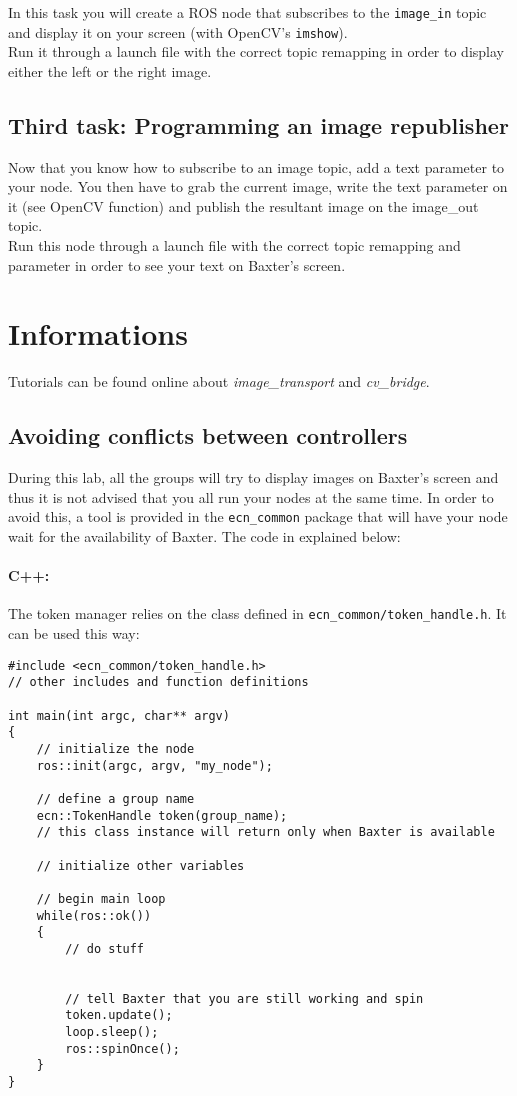 \documentclass{ecnreport}
\begin{document}
In this task you will create a ROS node that subscribes to the \texttt{image\_in} topic and display it on your screen (with OpenCV's \texttt{imshow}).\\
Run it through a launch file with the correct topic remapping in order to display either the left or the right image.

\subsection{Third task: Programming an image republisher}

Now that you know how to subscribe to an image topic, add a text parameter to your node. You then have to grab the current image, write the text parameter on it (see OpenCV function)
and publish the resultant image on the {image\_out} topic.\\
Run this node through a launch file with the correct topic remapping and parameter in order to see your text on Baxter's screen.


\section{Informations}

Tutorials can be found online about \emph{image\_transport} and \emph{cv\_bridge}.
 
 \subsection{Avoiding conflicts between controllers}
 
 During this lab, all the groups will try to display images on Baxter's screen and thus it is not advised
 that you all run your nodes at the same time. In order to avoid this, a tool is provided in the  \texttt{ecn\_common}
 package that will have your node wait for the availability of Baxter. The code in explained below:
 
 \paragraph{C++: } The token manager relies on the class defined in \texttt{ecn\_common/token\_handle.h}. It can be used this way:
\cppstyle \begin{lstlisting}
#include <ecn_common/token_handle.h>
// other includes and function definitions

int main(int argc, char** argv)
{
    // initialize the node
    ros::init(argc, argv, "my_node");

    // define a group name
    ecn::TokenHandle token(group_name);
    // this class instance will return only when Baxter is available
    
    // initialize other variables

    // begin main loop
    while(ros::ok())
    {
        // do stuff
        

        // tell Baxter that you are still working and spin
        token.update();
        loop.sleep();
        ros::spinOnce();
    }
}
\end{lstlisting}
\end{document}
